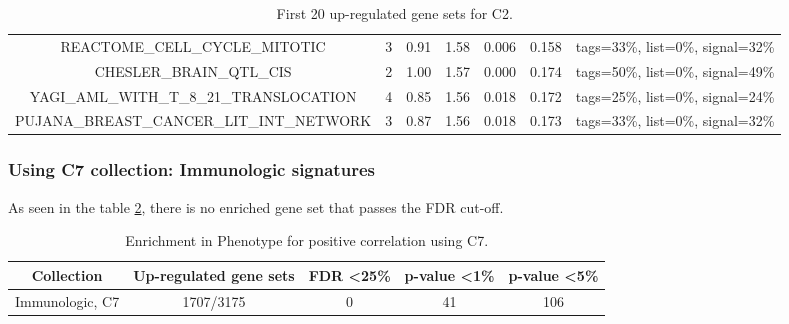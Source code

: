 \begin{table}[h!]
{\begin{tabular}{ccccccc}
    REACTOME\_CELL\_CYCLE\_MITOTIC                                & 3                     & 0.91                     & 1.58                     & 0.006                     & 0.158                     & tags=33\%, list=0\%, signal=32\%                     \\
    CHESLER\_BRAIN\_QTL\_CIS                                      & 2                     & 1.00                     & 1.57                     & 0.000                     & 0.174                     & tags=50\%, list=0\%, signal=49\%                     \\
    YAGI\_AML\_WITH\_T\_8\_21\_TRANSLOCATION                      & 4                     & 0.85                     & 1.56                     & 0.018                     & 0.172                     & tags=25\%, list=0\%, signal=24\%                     \\
    PUJANA\_BREAST\_CANCER\_LIT\_INT\_NETWORK & 3 & 0.87 & 1.56 & 0.018 & 0.173 & tags=33\%, list=0\%, signal=32\% 
    \\ \hline
    \end{tabular}%
    }
    \caption{First 20 up-regulated gene sets for C2.}
    \label{detailed_pos_c2}
    \end{table}

\newpage
\subsubsection{Using C7 collection: Immunologic signatures}

As seen in the table \ref{enr_ph_positive_c7}, there is no enriched gene set that passes the FDR cut-off.

\begin{table}[h!]
    \centering
    \begin{tabular}{ccccc}
    \hline
    Collection      & Up-regulated gene sets & FDR \textless 25\% & p-value \textless 1\% & p-value \textless 5\% \\ \hline
    Immunologic, C7 & 1707/3175              & 0                                 & 41                                   & 106                                  \\ \hline
    \end{tabular}
    \caption{Enrichment in Phenotype for positive correlation using C7.}
    \label{enr_ph_positive_c7}
    \end{table}

